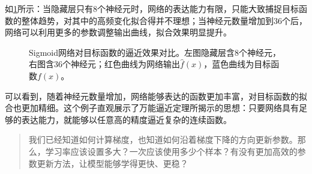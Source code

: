 如\cref{fig:sigmoid_approx_2d}所示：当隐藏层只有8个神经元时，网络的表达能力有限，只能大致捕捉目标函数的整体趋势，对其中的高频变化拟合得并不理想；当神经元数量增加到36个后，网络可以利用更多的参数调整输出曲线，拟合效果明显提升。

\begin{figure}[H]
    \caption{Sigmoid网络对目标函数的逼近效果对比。左图隐藏层含8个神经元，右图含36个神经元；红色曲线为网络输出$\hat{f}(x)$，蓝色曲线为目标函数$f(x)$。}
    \label{fig:sigmoid_approx_2d}
\end{figure}

可以看到，随着神经元数量增加，网络能够表达的函数更加丰富，对目标函数的拟合也更加精细。这个例子直观展示了万能逼近定理所揭示的思想：只要网络具有足够的表达能力，就能够以任意高的精度逼近复杂的连续函数。

\begin{quote}
    我们已经知道如何计算梯度，也知道如何沿着梯度下降的方向更新参数。那么，学习率应该设置多大？一次应该使用多少个样本？有没有更加高效的参数更新方法，让模型能够学得更快、更稳？
\end{quote}
